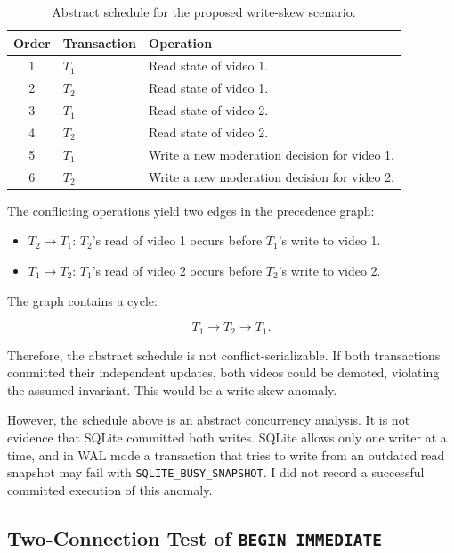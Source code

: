 \documentclass[11pt,a4paper]{article}
\begin{document}
\begin{table}[H]
\centering
\small
\begin{tabular}{clp{7.8cm}}
\toprule
\textbf{Order} & \textbf{Transaction} & \textbf{Operation} \\
\midrule
1 & \(T_1\) & Read state of video 1. \\
2 & \(T_2\) & Read state of video 1. \\
3 & \(T_1\) & Read state of video 2. \\
4 & \(T_2\) & Read state of video 2. \\
5 & \(T_1\) & Write a new moderation decision for video 1. \\
6 & \(T_2\) & Write a new moderation decision for video 2. \\
\bottomrule
\end{tabular}
\caption{Abstract schedule for the proposed write-skew scenario.}
\end{table}

The conflicting operations yield two edges in the precedence graph:

\begin{itemize}[leftmargin=2em]
    \item \(T_2 \rightarrow T_1\): \(T_2\)'s read of video 1
    occurs before \(T_1\)'s write to video 1.
    \item \(T_1 \rightarrow T_2\): \(T_1\)'s read of video 2
    occurs before \(T_2\)'s write to video 2.
\end{itemize}

The graph contains a cycle:

\[
T_1 \rightarrow T_2 \rightarrow T_1.
\]

Therefore, the abstract schedule is not conflict-serializable.
If both transactions committed their independent updates, both
videos could be demoted, violating the assumed invariant. This
would be a write-skew anomaly.

However, the schedule above is an abstract concurrency analysis.
It is not evidence that SQLite committed both writes. SQLite
allows only one writer at a time, and in WAL mode a transaction
that tries to write from an outdated read snapshot may fail with
\texttt{SQLITE\_BUSY\_SNAPSHOT}. I did not record a successful
committed execution of this anomaly.

\subsection{Two-Connection Test of \texttt{BEGIN IMMEDIATE}}
\end{document}
